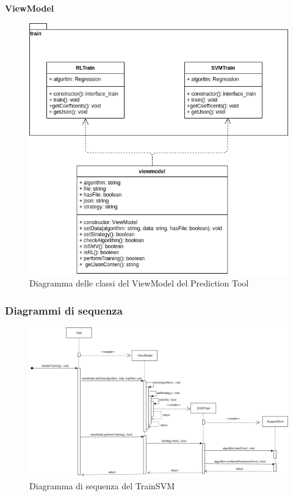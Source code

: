 \textbf{ViewModel}
\begin{figure}[H]
\centering
\includegraphics[scale=0.5]{../../Diagrams/Classes_diagrams/tool_modelview.png}
\caption{Diagramma delle classi del ViewModel del Prediction Tool}
\end{figure}


\subsubsection{Diagrammi di sequenza}
\begin{figure}[H]
\centering
\includegraphics[scale=0.45]{../../Diagrams/Sequence_diagrams/trainSVM.png}
\caption{Diagramma di sequenza del TrainSVM}
\end{figure}

